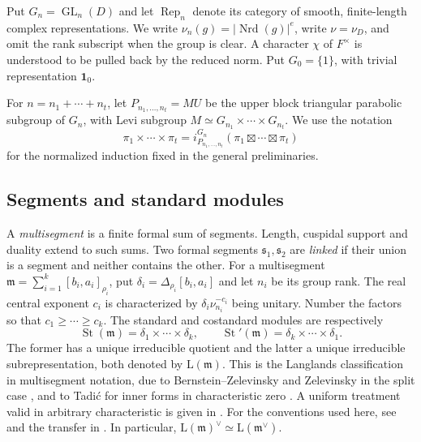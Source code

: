 \documentclass[10pt,a4paper]{article}
\theoremstyle{definition}
\theoremstyle{remark}
\numberwithin{equation}{section}
\newcommand{\rep}{\operatorname{Rep}}
\newcommand{\fm}{\mathfrak{m}}
\newcommand{\Lrep}{\mathrm{L}}
\newcommand{\St}{\operatorname{St}}
\newcommand{\one}{\mathbf{1}}
\DeclareMathOperator{\GL}{GL}
\newcommand{\De}{\Delta}
\begin{document}
Put $G_n=\GL_n(D)$ and let $\rep_n$ denote its category of smooth,
finite-length complex representations. We write
$\nu_n(g)=|\operatorname{Nrd}(g)|^e$, write $\nu=\nu_D$, and omit
the rank subscript when the group is clear.
A character $\chi$ of $F^\times$ is understood to be pulled back by
the reduced norm. Put $G_0=\{1\}$, with trivial representation $\one_0$.

For $n=n_1+\cdots+n_t$, let $P_{n_1,\ldots,n_t}=MU$ be the upper block
triangular parabolic subgroup of $G_n$, with Levi subgroup
$M\simeq G_{n_1}\times\cdots\times G_{n_t}$. We use the notation
\[
 \pi_1\times\cdots\times\pi_t
 =i_{P_{n_1,\ldots,n_t}}^{G_n}
   (\pi_1\boxtimes\cdots\boxtimes\pi_t)
\]
for the normalized induction fixed in the general preliminaries.

\subsection{Segments and standard modules}\label{S:Seg}

A \emph{multisegment} is a finite formal sum of segments. Length,
cuspidal support and duality extend to such sums.
Two formal segments $\mathfrak s_1,\mathfrak s_2$ are \emph{linked}
if their union is a segment and neither contains the other.
For a multisegment
$\fm=\sum_{i=1}^k[b_i,a_i]_{\rho_i}$, put
$\delta_i=\De_{\rho_i}[b_i,a_i]$ and let $n_i$ be its group rank.
The real central exponent $c_i$ is characterized by
$\delta_i\nu_{n_i}^{-c_i}$ being unitary.
Number the factors so that $c_1\geq\cdots\geq c_k$. The standard
and costandard modules are respectively
\[
 \St(\fm)=\delta_1\times\cdots\times\delta_k,\qquad
 \St'(\fm)=\delta_k\times\cdots\times\delta_1.
\]
The former has a unique irreducible quotient and the latter a unique
irreducible subrepresentation, both denoted by $\Lrep(\fm)$.
This is the Langlands classification in multisegment notation, due to
Bernstein--Zelevinsky and Zelevinsky in the split case
\cite{BZ1977,Zelevinsky1980}, and to Tadi{\'c} for inner forms in
characteristic zero \cite{Tadic1990}. A uniform treatment valid in
arbitrary characteristic is given in \cite[Appendix~A]{LM2016}.
For the conventions used here, see \cite[\S4.3]{EmertonHelm2014}
and the transfer in \cite[Theorem~3.8]{RegularLM2018}. In particular,
$\Lrep(\fm)^\vee\simeq\Lrep(\fm^\vee)$.
\end{document}
